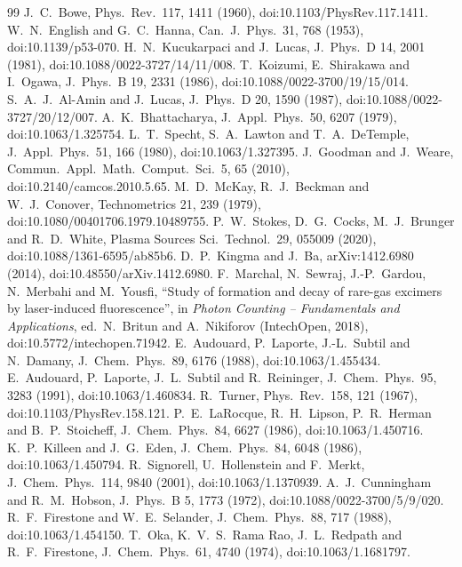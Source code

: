 \documentclass[11pt]{article}
\begin{document}
\begin{thebibliography}{99}
 J.~C.~Bowe, Phys.\ Rev.\ 117, 1411 (1960), doi:10.1103/PhysRev.117.1411.
 W.~N.~English and G.~C.~Hanna, Can.\ J.\ Phys.\ 31, 768 (1953), doi:10.1139/p53-070.
 H.~N.~Kucukarpaci and J.~Lucas, J.\ Phys.\ D 14, 2001 (1981), doi:10.1088/0022-3727/14/11/008.
 T.~Koizumi, E.~Shirakawa and I.~Ogawa, J.\ Phys.\ B 19, 2331 (1986), doi:10.1088/0022-3700/19/15/014.
 S.~A.~J.~Al-Amin and J.~Lucas, J.\ Phys.\ D 20, 1590 (1987), doi:10.1088/0022-3727/20/12/007.
 A.~K.~Bhattacharya, J.\ Appl.\ Phys.\ 50, 6207 (1979), doi:10.1063/1.325754.
 L.~T.~Specht, S.~A.~Lawton and T.~A.~DeTemple, J.\ Appl.\ Phys.\ 51, 166 (1980), doi:10.1063/1.327395.
 J.~Goodman and J.~Weare, Commun.\ Appl.\ Math.\ Comput.\ Sci.\ 5, 65 (2010), doi:10.2140/camcos.2010.5.65.
 M.~D.~McKay, R.~J.~Beckman and W.~J.~Conover, Technometrics 21, 239 (1979), doi:10.1080/00401706.1979.10489755.
 P.~W.~Stokes, D.~G.~Cocks, M.~J.~Brunger and R.~D.~White, Plasma Sources Sci.\ Technol.\ 29, 055009 (2020), doi:10.1088/1361-6595/ab85b6.
 D.~P.~Kingma and J.~Ba, arXiv:1412.6980 (2014), doi:10.48550/arXiv.1412.6980.
 F.~Marchal, N.~Sewraj, J.-P.~Gardou, N.~Merbahi and M.~Yousfi, ``Study of formation and decay of rare-gas excimers by laser-induced fluorescence'', in \emph{Photon Counting -- Fundamentals and Applications}, ed.\ N.~Britun and A.~Nikiforov (IntechOpen, 2018), doi:10.5772/intechopen.71942.
 E.~Audouard, P.~Laporte, J.-L.~Subtil and N.~Damany, J.\ Chem.\ Phys.\ 89, 6176 (1988), doi:10.1063/1.455434.
 E.~Audouard, P.~Laporte, J.~L.~Subtil and R.~Reininger, J.\ Chem.\ Phys.\ 95, 3283 (1991), doi:10.1063/1.460834.
 R.~Turner, Phys.\ Rev.\ 158, 121 (1967), doi:10.1103/PhysRev.158.121.
 P.~E.~LaRocque, R.~H.~Lipson, P.~R.~Herman and B.~P.~Stoicheff, J.\ Chem.\ Phys.\ 84, 6627 (1986), doi:10.1063/1.450716.
 K.~P.~Killeen and J.~G.~Eden, J.\ Chem.\ Phys.\ 84, 6048 (1986), doi:10.1063/1.450794.
 R.~Signorell, U.~Hollenstein and F.~Merkt, J.\ Chem.\ Phys.\ 114, 9840 (2001), doi:10.1063/1.1370939.
 A.~J.~Cunningham and R.~M.~Hobson, J.\ Phys.\ B 5, 1773 (1972), doi:10.1088/0022-3700/5/9/020.
 R.~F.~Firestone and W.~E.~Selander, J.\ Chem.\ Phys.\ 88, 717 (1988), doi:10.1063/1.454150.
 T.~Oka, K.~V.~S.~Rama Rao, J.~L.~Redpath and R.~F.~Firestone, J.\ Chem.\ Phys.\ 61, 4740 (1974), doi:10.1063/1.1681797.

\end{thebibliography}
\end{document}

